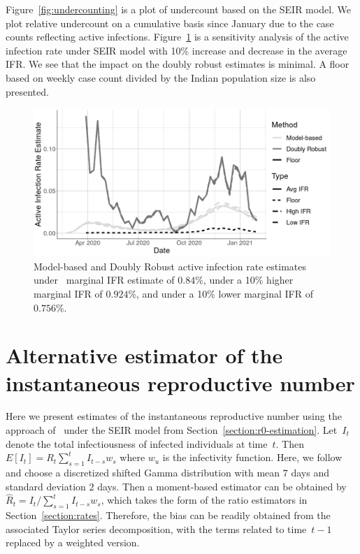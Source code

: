 \documentclass[11pt]{amsart}
\numberwithin{equation}{section}
\theoremstyle{plain}
\begin{document}
Figure~\ref{fig:undercounting} is a plot of undercount based on the SEIR model.  We plot relative undercount on a cumulative basis since January due to the case counts reflecting active infections. Figure~\ref{fig:tv_air_sens} is a sensitivity analysis of the active infection rate under SEIR model with 10\% increase and decrease in the average IFR.  We see that the impact on the doubly robust estimates is minimal.  A floor based on weekly case count divided by the Indian population size is also presented.



\begin{figure}[!th]
 \centering
 \includegraphics[width=.6\linewidth]{../figs/tv_air_sensitivity.png}
 \caption{Model-based and Doubly Robust active infection rate estimates under~\cite{Ironse2103272118} marginal IFR estimate of $0.84$\%, under a 10\% higher marginal IFR of $0.924$\%, and under a 10\% lower marginal IFR of $0.756$\%.}
 \label{fig:tv_air_sens}
\end{figure}

\section{Alternative estimator of the instantaneous reproductive number}
\label{app:cori_rt}

Here we present estimates of the instantaneous reproductive number using the approach of~\cite{Cori20113} under the SEIR model from Section~\ref{section:r0-estimation}.  Let~$I_t$ denote the total infectiousness of infected individuals at time~$t$.  Then~$E[I_t] = R_t \sum_{s=1}^{t} I_{t-s} w_s$ where $w_{u}$ is the infectivity function.  Here, we follow~\cite{Cori20113} and choose a discretized shifted Gamma distribution with mean $7$ days and standard deviation $2$ days.  Then a moment-based estimator can be obtained by $\hat R_t = I_t / \sum_{s=1}^t I_{t-s} w_s$, which takes the form of the ratio estimators in Section~\ref{section:rates}.  Therefore, the bias can be readily obtained from the associated Taylor series decomposition, with the terms related to time~$t-1$ replaced by a weighted version.
\end{document}
